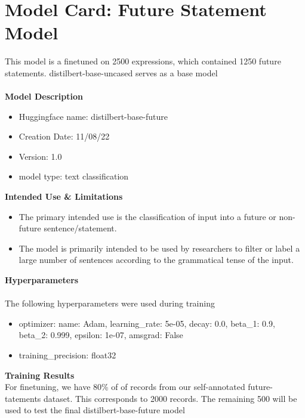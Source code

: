 \appendix
\section{Model Card: Future Statement Model}
This model is a finetuned on 2500 expressions, which contained 1250 future statements. distilbert-base-uncased serves as a base model
\\
\\
%
\textbf{Model Description}
%
\begin{itemize}
    \item Huggingface name: distilbert-base-future
    \item Creation Date: 11/08/22
    \item Version: 1.0
    \item model type: text classification
\end{itemize}%
%
\textbf{Intended Use \& Limitations}
%
\begin{itemize}
    \item The primary intended use is the classification of input into a future or non-future sentence/statement.
    \item The model is primarily intended to be used by researchers to filter or label a large number of sentences according to the grammatical tense of the input.
\end{itemize}%
%
\textbf{Hyperparameters}
\\
\\
The following hyperparameters were used during training
\begin{itemize}
    \item optimizer:
    name: Adam, learning\_rate: 5e-05, decay: 0.0, beta\_1: 0.9, beta\_2: 0.999, epsilon: 1e-07, amsgrad: False
    \item training\_precision: float32
\end{itemize}%
\label{sec:appendix}
%
\textbf{Training Results}
\\
For finetuning, we have 80\% of of records from our self-annotated future-tatements dataset. This corresponds to 2000 records.
The remaining 500 will be used to test the final distilbert-base-future model
\\
